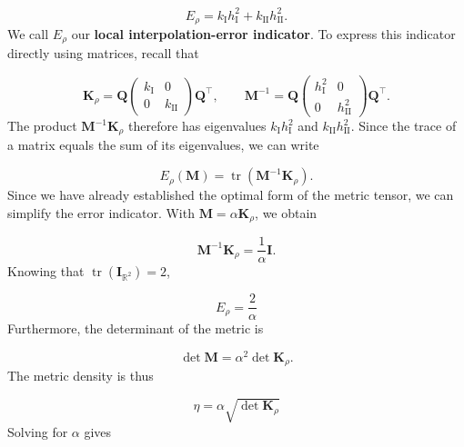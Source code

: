 \documentclass[11pt,a4paper]{article}
\begin{document}
\begin{equation}
\boxed{
E_\rho
=k_{\mathrm I}h_{\mathrm I}^2
+k_{\mathrm{II}}h_{\mathrm{II}}^2.
}
\end{equation}
\noindent
We call $E_\rho$ our \textbf{local interpolation-error indicator}. To express this indicator directly using matrices, recall that

\begin{equation*}
\mathbf K_\rho
=\mathbf Q
\begin{pmatrix}
k_{\mathrm I}&0\\
0&k_{\mathrm{II}}
\end{pmatrix}
\mathbf Q^\top,\qquad
\mathbf M^{-1}
=\mathbf Q
\begin{pmatrix}
h_{\mathrm I}^2&0\\
0&h_{\mathrm{II}}^2
\end{pmatrix}
\mathbf Q^\top.
\end{equation*}
\noindent
The product $\mathbf M^{-1}\mathbf K_\rho$ therefore has eigenvalues $k_{\mathrm I}h_{\mathrm I}^2$ and $k_{\mathrm{II}}h_{\mathrm{II}}^2$. Since the trace of a matrix equals the sum of its eigenvalues, we can write

\begin{equation}
\boxed{
E_\rho(\mathbf M)
=\operatorname{tr}\!\left(\mathbf M^{-1}\mathbf K_\rho\right).
}
\end{equation}
\noindent
\noindent
Since we have already established the optimal form of the metric tensor, we can simplify the error indicator. With $\mathbf M=\alpha\mathbf K_\rho$, we obtain

\begin{equation*}
\mathbf M^{-1}\mathbf K_\rho=\frac{1}{\alpha}\mathbf I.
\end{equation*}
\noindent
Knowing that $\operatorname{tr}\left(\mathbf{I}_{\mathbb{R}^2}\right)=2$, 

\begin{equation}
\boxed{
E_\rho=\frac{2}{\alpha}
}
\end{equation}
\noindent
Furthermore, the determinant of the metric is

\begin{equation*}
\det\mathbf M=\alpha^2\det\mathbf K_\rho.
\end{equation*}
\noindent
The metric density is thus

\begin{equation}
\label{eq:alpha eta}
\boxed{
\eta=\alpha\sqrt{\det\mathbf K_\rho}
}
\end{equation}
\noindent
Solving for $\alpha$ gives
\end{document}
